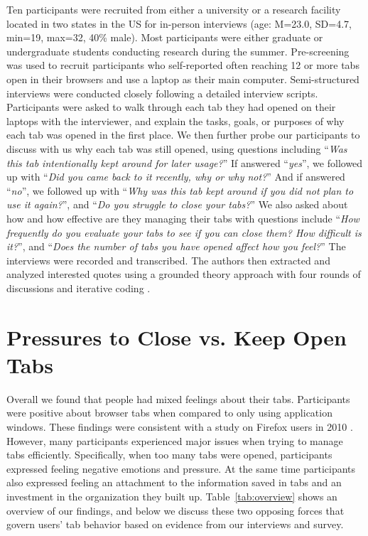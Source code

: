 Ten participants were recruited from either a university or a research facility located in two states in the US for in-person interviews (age: M=23.0, SD=4.7, min=19, max=32, 40\% male). Most participants were either graduate or undergraduate students conducting research during the summer. Pre-screening was used to recruit participants who self-reported often reaching 12 or more tabs open in their browsers and use a laptop as their main computer. 
Semi-structured interviews were conducted closely following a detailed interview scripts. Participants were asked to walk through each tab they had opened on their laptops with the interviewer, and explain the tasks, goals, or purposes of why each tab was opened in the first place. We then further probe our participants to discuss with us why each tab was still opened, using questions including ``\emph{Was this tab intentionally kept around for later usage?}'' If answered ``\emph{yes}'', we followed up with ``\emph{Did you came back to it recently, why or why not?}'' And if answered ``\emph{no}'', we followed up with ``\emph{Why was this tab kept around if you did not plan to use it again?}'', and ``\emph{Do you struggle to close your tabs?}''  We also asked about how and how effective are they managing their tabs with questions include ``\emph{How frequently do you evaluate your tabs to see if you can close them? How difficult is it?}'', and ``\emph{Does the number of tabs you have opened affect how you feel?}'' The interviews were recorded and transcribed. The authors then extracted and analyzed interested quotes using a grounded theory approach with four rounds of discussions and iterative coding \cite{strauss1998basics}.


\section{Pressures to Close vs. Keep Open Tabs}

Overall we found that people had mixed feelings about their tabs. Participants were positive about browser tabs when compared to only using application windows. These findings were consistent with a study on Firefox users in 2010 \cite{Dubroy:2010:STB:1753326.1753426}. 
However, many participants experienced major issues when trying to manage tabs efficiently. Specifically, when too many tabs were opened, participants expressed feeling negative emotions and pressure. At the same time participants also expressed feeling an attachment to the information saved in tabs and an investment in the organization they built up. Table~\ref{tab:overview} shows an overview of our findings, and below we discuss these two opposing forces that govern users' tab behavior based on evidence from our interviews and survey.

